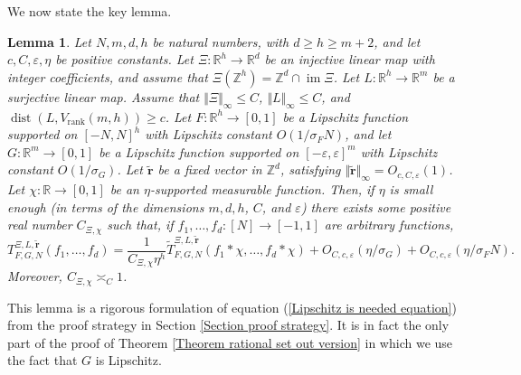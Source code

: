 \documentclass[12pt,a4paper,twoside,reqno]{amsart}
\newtheorem{Lemma}[Theorem]{Lemma}
\newcommand{\rank}{\operatorname{rank}}
\newcommand{\dist}{\operatorname{dist}}
\newcommand{\im}{\operatorname{im}}
\numberwithin{equation}{section}
\begin{document}
We now state the key lemma. 
\begin{Lemma}
\label{Lemma transfer equation}
Let $N,m,d, h$ be natural numbers, with $d\geqslant h\geqslant m+2$, and let $c,C,\varepsilon,\eta$ be positive constants. Let $\Xi:\mathbb{R}^h\longrightarrow \mathbb{R}^d$ be an injective linear map with integer coefficients, and assume that $\Xi(\mathbb{Z}^{h}) = \mathbb{Z}^d \cap \im \Xi$. Let $L:\mathbb{R}^h \longrightarrow \mathbb{R}^m$ be a surjective linear map. Assume that $\Vert \Xi \Vert_\infty \leqslant C$, $\Vert L \Vert_\infty \leqslant C$, and $\dist(L,V_{\rank}(m,h)) \geqslant c$. Let $F:\mathbb{R}^h\longrightarrow [0,1]$ be a Lipschitz function supported on $[-N,N]^h$ with Lipschitz constant $O(1/\sigma_FN)$, and let $G:\mathbb{R}^{m}\longrightarrow [0,1]$ be a Lipschitz function supported on $[-\varepsilon,\varepsilon]^m$ with Lipschitz constant $O(1/\sigma_G)$. Let $\widetilde{\mathbf{r}}$ be a fixed vector in $\mathbb{Z}^d$, satisfying $\Vert \widetilde{\mathbf{r}}\Vert_\infty = O_{c,C,\varepsilon}(1)$. Let $\chi:\mathbb{R}\longrightarrow [0,1]$ be an $\eta$-supported measurable function. Then, if $\eta$ is small enough (in terms of the dimensions $m,d,h$, $C$, and $\varepsilon$) there exists some positive real number $C_{\Xi,\chi}$ such that, if $f_1,\dots,f_d:[N]\longrightarrow [-1,1]$ are arbitrary functions,
\begin{equation}
\label{eqn transfer equation}
T_{F,G,N}^{\Xi,L,\widetilde{\mathbf{r}}}(f_1,\dots,f_d) = \frac{1}{C_{\Xi,\chi}\eta^{h}}\widetilde{T}_{F,G,N}^{\Xi,L,\widetilde{\mathbf{r}}}(f_1\ast \chi,\dots,f_d\ast \chi) + O_{C,c,\varepsilon}(\eta/\sigma_G) + O_{C,c,\varepsilon}(\eta/\sigma_F N).
\end{equation}
\noindent Moreover, $C_{\Xi,\chi} \asymp_C 1$.
\end{Lemma}
\noindent This lemma is a rigorous formulation of equation (\ref{Lipschitz is needed equation}) from the proof strategy in Section \ref{Section proof strategy}. It is in fact the only part of the proof of Theorem \ref{Theorem rational set out version} in which we use the fact that $G$ is Lipschitz. 
\end{document}
